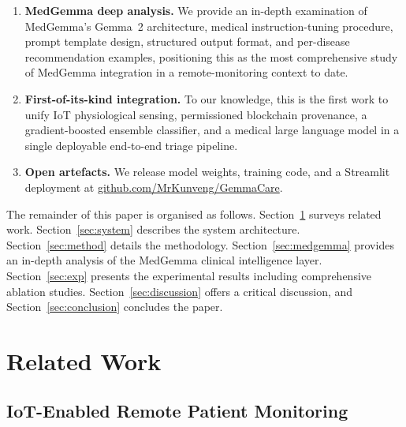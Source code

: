 \documentclass[journal]{IEEEtran}
\begin{document}
\begin{enumerate}
  \item \textbf{MedGemma deep analysis.} We provide an in-depth examination
  of MedGemma's Gemma~2 architecture, medical instruction-tuning procedure,
  prompt template design, structured output format, and per-disease
  recommendation examples, positioning this as the most comprehensive study of
  MedGemma integration in a remote-monitoring context to date.

  \item \textbf{First-of-its-kind integration.} To our knowledge, this is the
  first work to unify IoT physiological sensing, permissioned blockchain
  provenance, a gradient-boosted ensemble classifier, and a medical large
  language model in a single deployable end-to-end triage pipeline.

  \item \textbf{Open artefacts.} We release model weights, training code,
  and a Streamlit deployment at
  \href{https://github.com/MrKunveng/GemmaCare}{github.com/MrKunveng/GemmaCare}.

\end{enumerate}

The remainder of this paper is organised as follows. Section~\ref{sec:related}
surveys related work. Section~\ref{sec:system} describes the system
architecture. Section~\ref{sec:method} details the methodology.
Section~\ref{sec:medgemma} provides an in-depth analysis of the MedGemma
clinical intelligence layer. Section~\ref{sec:exp} presents the experimental
results including comprehensive ablation studies. Section~\ref{sec:discussion}
offers a critical discussion, and Section~\ref{sec:conclusion} concludes the
paper.

\section{Related Work}
\label{sec:related}

\subsection{IoT-Enabled Remote Patient Monitoring}
\end{document}
